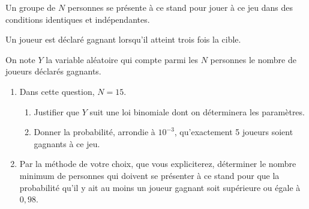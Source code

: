 \documentclass[10pt]{article}
\begin{document}
Un groupe de $N$ personnes se présente à ce stand pour jouer à ce jeu dans des conditions identiques et indépendantes. 

Un joueur est déclaré gagnant lorsqu'il atteint trois fois la cible.

On note $Y$ la variable aléatoire qui compte parmi les $N$ personnes le nombre de joueurs déclarés gagnants.

\medskip

\begin{enumerate}
\item Dans cette question, $N = 15$.
	\begin{enumerate}
		\item Justifier que $Y$ suit une loi binomiale dont on déterminera les paramètres.
		\item Donner la probabilité, arrondie à $10^{-3}$, qu'exactement 5 joueurs soient gagnants à ce jeu.
	\end{enumerate}
\item Par la méthode de votre choix, que vous expliciterez, déterminer le nombre minimum de personnes qui doivent se présenter à ce stand pour que la probabilité qu'il y ait au moins un joueur gagnant soit supérieure ou égale à $0,98$.
\end{enumerate}

\bigskip
\end{document}
